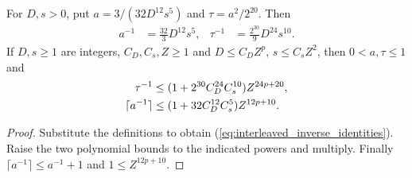 \begin{lemma}
    \label{lem:interleaved_inverse_polynomial_costs}
    \leanok
    For $D,s>0$, put $a=3/(32D^{12}s^5)$ and $\tau=a^2/2^{20}$. Then
    \begin{align}
        a^{-1}    & =\tfrac{32}{3}D^{12}s^5,      &
        \tau^{-1} & =\tfrac{2^{30}}9D^{24}s^{10}.
        \label{eq:interleaved_inverse_identities}
    \end{align}
    If $D,s\ge1$ are integers, $C_D,C_s,Z\ge1$ and
    $D\le C_DZ^p$, $s\le C_sZ^2$, then $0<a,\tau\le1$ and
    \begin{align}
        \tau^{-1}           & \le(1+2^{30}C_D^{24}C_s^{10})Z^{24p+20},\notag \\
        \lceil a^{-1}\rceil & \le(1+32C_D^{12}C_s^5)Z^{12p+10}.
        \label{eq:interleaved_inverse_polynomial_costs}
    \end{align}
\end{lemma}
\begin{proof}\leanok
    Substitute the definitions to obtain
    (\ref{eq:interleaved_inverse_identities}). Raise the two polynomial
    bounds to the indicated powers and multiply. Finally
    $\lceil a^{-1}\rceil\le a^{-1}+1$ and $1\le Z^{12p+10}$.
\end{proof}

